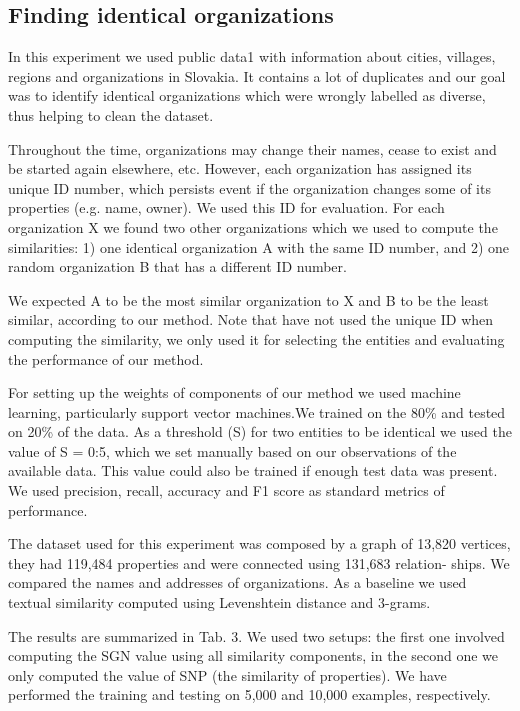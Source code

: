 \documentclass{llncs}
\begin{document}
\subsection {Finding identical organizations}
In this experiment we used public data1 with information about cities, villages,
regions and organizations in Slovakia. It contains a lot of duplicates and our goal
was to identify identical organizations which were wrongly labelled as diverse,
thus helping to clean the dataset.

Throughout the time, organizations may change their names, cease to exist
and be started again elsewhere, etc. However, each organization has assigned
its unique ID number, which persists event if the organization changes some
of its properties (e.g. name, owner). We used this ID for evaluation. For each
organization X we found two other organizations which we used to compute the
similarities: 1) one identical organization A with the same ID number, and 2)
one random organization B that has a different ID number.

We expected A to be the most similar organization to X and B to be the
least similar, according to our method. Note that have not used the unique ID
when computing the similarity, we only used it for selecting the entities and
evaluating the performance of our method.

For setting up the weights of components of our method we used machine
learning, particularly support vector machines.We trained on the 80\% and tested
on 20\% of the data. As a threshold (S) for two entities to be identical we used the
value of S = 0:5, which we set manually based on our observations of the available
data. This value could also be trained if enough test data was present. We used
precision, recall, accuracy and F1 score as standard metrics of performance.

The dataset used for this experiment was composed by a graph of 13,820
vertices, they had 119,484 properties and were connected using 131,683 relation-
ships. We compared the names and addresses of organizations. As a baseline we
used textual similarity computed using Levenshtein distance and 3-grams.

The results are summarized in Tab. 3. We used two setups: the first one
involved computing the SGN value using all similarity components, in the second
one we only computed the value of SNP (the similarity of properties). We have
performed the training and testing on 5,000 and 10,000 examples, respectively.
\end{document}
